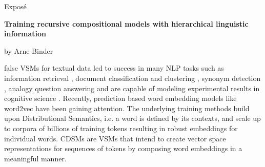 
\begin{center}
	\huge{Expos\'e} 
	\vspace{0.5cm}
	 
	\large{\bf{%
	Training recursive compositional models with hierarchical linguistic information
			}} 
	\vspace{0.5cm}

	by Arne Binder \\
\end{center}

\vspace{0.5cm}
\normalsize

\if false
\acfp{VSM} for textual data \autocite{salton_vector_1975} led to success in many \ac{NLP} tasks %
such as information retrieval \autocite{dierk_smart_1971,deerwester_indexing_1990}, document classification and clustering , synonym detection \autocite{rapp_word_2003}, analogy question answering \autocite{turney_similarity_2006} and are capable of modeling experimental results in cognitive science \autocite{landauer_solution_1997,mcdonald_testing_2001}.
Recently, prediction based word embedding models like word2vec \autocite{mikolov_efficient_2013} have been gaining attention. %
The underlying training methods build upon Distributional Semantics, i.e. a word is defined by its contexts, and scale up to %
corpora of billions of training tokens \autocite{mikolov_distributed_2013} resulting in robust embeddings for individual words. 
\acfp{CDSM} are \acp{VSM} that intend to create vector space representations for sequences of tokens by composing word embeddings in a meaningful manner. 
\fi

